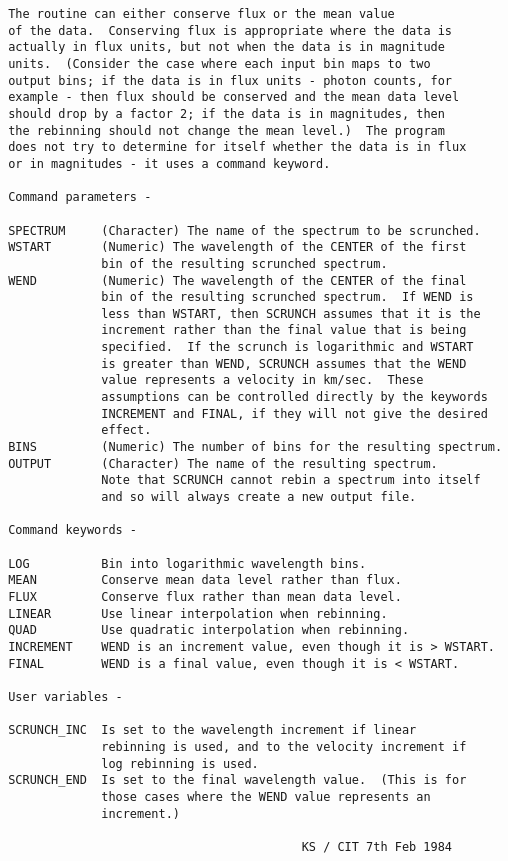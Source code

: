 \begin{description}
\begin{verbatim}
 The routine can either conserve flux or the mean value
 of the data.  Conserving flux is appropriate where the data is
 actually in flux units, but not when the data is in magnitude
 units.  (Consider the case where each input bin maps to two
 output bins; if the data is in flux units - photon counts, for
 example - then flux should be conserved and the mean data level
 should drop by a factor 2; if the data is in magnitudes, then
 the rebinning should not change the mean level.)  The program
 does not try to determine for itself whether the data is in flux
 or in magnitudes - it uses a command keyword.

 Command parameters -

 SPECTRUM     (Character) The name of the spectrum to be scrunched.
 WSTART       (Numeric) The wavelength of the CENTER of the first
              bin of the resulting scrunched spectrum.
 WEND         (Numeric) The wavelength of the CENTER of the final
              bin of the resulting scrunched spectrum.  If WEND is
              less than WSTART, then SCRUNCH assumes that it is the
              increment rather than the final value that is being
              specified.  If the scrunch is logarithmic and WSTART
              is greater than WEND, SCRUNCH assumes that the WEND
              value represents a velocity in km/sec.  These
              assumptions can be controlled directly by the keywords
              INCREMENT and FINAL, if they will not give the desired
              effect.
 BINS         (Numeric) The number of bins for the resulting spectrum.
 OUTPUT       (Character) The name of the resulting spectrum.
              Note that SCRUNCH cannot rebin a spectrum into itself
              and so will always create a new output file.

 Command keywords -

 LOG          Bin into logarithmic wavelength bins.
 MEAN         Conserve mean data level rather than flux.
 FLUX         Conserve flux rather than mean data level.
 LINEAR       Use linear interpolation when rebinning.
 QUAD         Use quadratic interpolation when rebinning.
 INCREMENT    WEND is an increment value, even though it is > WSTART.
 FINAL        WEND is a final value, even though it is < WSTART.

 User variables -

 SCRUNCH_INC  Is set to the wavelength increment if linear
              rebinning is used, and to the velocity increment if
              log rebinning is used.
 SCRUNCH_END  Is set to the final wavelength value.  (This is for
              those cases where the WEND value represents an
              increment.)

                                          KS / CIT 7th Feb 1984
\end{verbatim}
\end{description}
